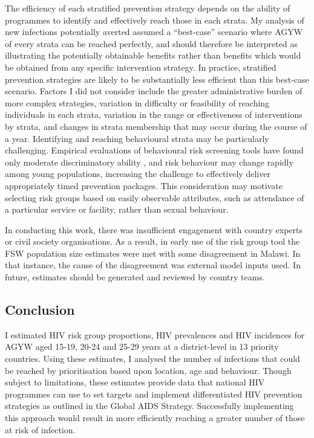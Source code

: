 \documentclass[a4paper, nobind]{templates/ociamthesis}
\begin{document}
The efficiency of each stratified prevention strategy depends on the ability of programmes to identify and effectively reach those in each strata.
My analysis of new infections potentially averted assumed a ``best-case'' scenario where AGYW of every strata can be reached perfectly, and should therefore be interpreted as illustrating the potentially obtainable benefits rather than benefits which would be obtained from any specific intervention strategy.
In practice, stratified prevention strategies are likely to be substantially less efficient than this best-case scenario.
Factors I did not consider include the greater administrative burden of more complex strategies, variation in difficulty or feasibility of reaching individuals in each strata, variation in the range or effectiveness of interventions by strata, and changes in strata membership that may occur during the course of a year.
Identifying and reaching behavioural strata may be particularly challenging.
Empirical evaluations of behavioural risk screening tools have found only moderate discriminatory ability \autocite{jia2022risk}, and risk behaviour may change rapidly among young populations, increasing the challenge to effectively deliver appropriately timed prevention packages.
This consideration may motivate selecting risk groups based on easily observable attributes, such as attendance of a particular service or facility, rather than sexual behaviour.

In conducting this work, there was insufficient engagement with country experts or civil society organisations.
As a result, in early use of the risk group tool the FSW population size estimates were met with some disagreement in Malawi.
In that instance, the cause of the disagreement was external model inputs used.
In future, estimates should be generated and reviewed by country teams.

\hypertarget{conclusion}{%
\subsection{Conclusion}\label{conclusion}}

I estimated HIV risk group proportions, HIV prevalences and HIV incidences for AGYW aged 15-19, 20-24 and 25-29 years at a district-level in 13 priority countries.
Using these estimates, I analysed the number of infections that could be reached by prioritisation based upon location, age and behaviour.
Though subject to limitations, these estimates provide data that national HIV programmes can use to set targets and implement differentiated HIV prevention strategies as outlined in the Global AIDS Strategy.
Successfully implementing this approach would result in more efficiently reaching a greater number of those at risk of infection.
\end{document}
